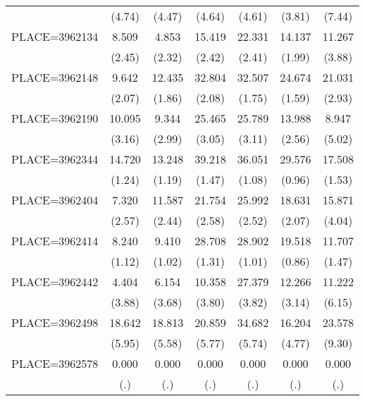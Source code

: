 {\begin{tabular}{l*{6}{c}}
                    &      (4.74)&      (4.47)&      (4.64)&      (4.61)&      (3.81)&      (7.44)\\
PLACE=3962134       &       8.509&       4.853&      15.419&      22.331&      14.137&      11.267\\
                    &      (2.45)&      (2.32)&      (2.42)&      (2.41)&      (1.99)&      (3.88)\\
PLACE=3962148       &       9.642&      12.435&      32.804&      32.507&      24.674&      21.031\\
                    &      (2.07)&      (1.86)&      (2.08)&      (1.75)&      (1.59)&      (2.93)\\
PLACE=3962190       &      10.095&       9.344&      25.465&      25.789&      13.988&       8.947\\
                    &      (3.16)&      (2.99)&      (3.05)&      (3.11)&      (2.56)&      (5.02)\\
PLACE=3962344       &      14.720&      13.248&      39.218&      36.051&      29.576&      17.508\\
                    &      (1.24)&      (1.19)&      (1.47)&      (1.08)&      (0.96)&      (1.53)\\
PLACE=3962404       &       7.320&      11.587&      21.754&      25.992&      18.631&      15.871\\
                    &      (2.57)&      (2.44)&      (2.58)&      (2.52)&      (2.07)&      (4.04)\\
PLACE=3962414       &       8.240&       9.410&      28.708&      28.902&      19.518&      11.707\\
                    &      (1.12)&      (1.02)&      (1.31)&      (1.01)&      (0.86)&      (1.47)\\
PLACE=3962442       &       4.404&       6.154&      10.358&      27.379&      12.266&      11.222\\
                    &      (3.88)&      (3.68)&      (3.80)&      (3.82)&      (3.14)&      (6.15)\\
PLACE=3962498       &      18.642&      18.813&      20.859&      34.682&      16.204&      23.578\\
                    &      (5.95)&      (5.58)&      (5.77)&      (5.74)&      (4.77)&      (9.30)\\
PLACE=3962578       &       0.000&       0.000&       0.000&       0.000&       0.000&       0.000\\
                    &         (.)&         (.)&         (.)&         (.)&         (.)&         (.)\\

\end{tabular}}
